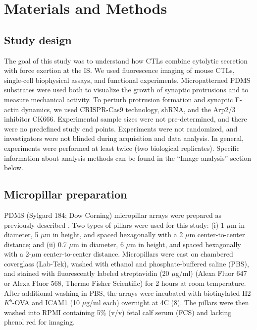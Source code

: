 \section{Materials and Methods}

\subsection{Study design}
The goal of this study was to understand how CTLs combine cytolytic secretion with force exertion at the IS. We used fluorescence imaging of mouse CTLs, single-cell biophysical assays, and functional experiments. Micropatterned PDMS substrates were used both to visualize the growth of synaptic protrusions and to measure mechanical activity. To perturb protrusion formation and synaptic F-actin dynamics, we used CRISPR-Cas9 technology, shRNA, and the Arp2/3 inhibitor CK666. Experimental sample sizes were not pre-determined, and there were no predefined study end points. Experiments were not randomized, and investigators were not blinded during acquisition and data analysis. In general, experiments were performed at least twice (two biological replicates). Specific information about analysis methods can be found in the “Image analysis” section below.

\subsection{Micropillar preparation}
PDMS (Sylgard 184; Dow Corning) micropillar arrays were prepared as previously described \cite{Bashour2014}. Two types of pillars were used for this study: (i) 1 $\mu$m in diameter, 5 $\mu$m in height, and spaced hexagonally with a 2 $\mu$m center-to-center distance; and (ii) 0.7 $\mu$m in diameter, 6 $\mu$m in height, and spaced hexagonally with a 2-$\mu$m center-to-center distance. Micropillars were cast on chambered coverglass (Lab-Tek), washed with ethanol and phosphate-buffered saline (PBS), and stained with fluorescently labeled streptavidin (20 $\mu$g/ml) (Alexa Fluor 647 or Alexa Fluor 568, Thermo Fisher Scientific) for 2 hours at room temperature. After additional washing in PBS, the arrays were incubated with biotinylated H2-$K^{b}$-OVA and ICAM1 (10 $\mu$g/ml each) overnight at 4\degree C (8). The pillars were then washed into RPMI containing 5\% (v/v) fetal calf serum (FCS) and lacking phenol red for imaging.

